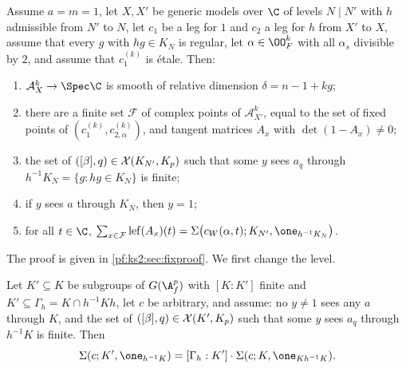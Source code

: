 \begin{proposition}\label{pf:ks2:hfp}
Assume $a=m=1$, let $X,X'$ be generic models over $\C$ of levels $N\mid N'$ with $h$ admissible from
$N'$ to $N$, let $c_1$ be a leg for $1$ and $c_2$ a leg for $h$
from $X'$ to $X$, assume that every $g$ with $hg\in K_N$ is regular, let $\alpha\in\kstwoOF^k$ with all
$\alpha_s$ divisible by $2$, and assume that $c_1^{(k)}$ is \'etale. Then:
\begin{enumerate}
\item $\mathcal A_X^k\to\Spec\C$ is smooth of relative dimension $\delta=n-1+kg$;
\item there are a finite set $\mathcal F$ of complex points of $\mathcal A_{X'}^k$, equal to the set of
  fixed points of $(c_1^{(k)},c^{(k)}_{2,\alpha})$, and tangent matrices $A_x$ with $\det(1-A_x)\ne0$;
\item the set of $([\beta],q)\in\mathcal{X}(K_{N'},K_{p})$ such that some $y$ sees $a_q$ through
  $h^{-1}K_N=\{g:hg\in K_N\}$ is finite;
\item if $y$ sees $a$ through $K_N$, then $y=1$;
\item for all $t\in\C$,
$\sum_{x\in\mathcal F}\mathrm{lef}(A_x)(t)=\Sigma\bigl(c_W(\alpha,t);K_{N'},\one_{h^{-1}K_N}\bigr)$.
\end{enumerate}
\end{proposition}

The proof is given in \cref{pf:ks2:sec:fixproof}. We first change the level.

\begin{proposition}\label{pf:ks2:levelchange}
Let $K'\subseteq K$ be subgroups of $\kstwoG$ with $[K:K']$ finite and $K'\subseteq\Gamma_h=K\cap
h^{-1}Kh$, let $c$ be arbitrary, and assume: no $y\ne1$ sees any $a$ through $K$, and the set of
$([\beta],q)\in\mathcal{X}(K',K_{p})$ such that some $y$ sees $a_q$ through $h^{-1}K$ is finite.
Then
\[
\Sigma(c;K',\one_{h^{-1}K})=[\Gamma_h:K']\cdot\Sigma(c;K,\one_{Kh^{-1}K}).
\]
\end{proposition}

